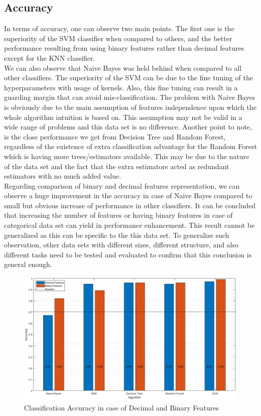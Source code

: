 \documentclass{article}
\begin{document}
\subsection{Accuracy}
In terms of accuracy, one can observe two main points. The first one is the superiority of the SVM classifier when compared to others, and the better performance resulting from using binary features rather than decimal features except for the KNN classifier. \\
\indent We can also observe that Naive Bayes was held behind when compared to all other classifiers. The superiority of the SVM can be due to the fine tuning of the hyperparameters with usage of kernels. Also, this fine tuning can result in a guarding margin that can avoid mis-classification. The problem with Naive Bayes is obviously due to the main assumption of features independence upon which the whole algorithm intuition is based on. This assumption may not be valid in a wide range of problems and this data set is no difference. Another point to note, is the close performance we get from Decision Tree and Random Forest, regardless of the existence of extra classification advantage for the Random Forest which is having more trees/estimators available. This may be due to the nature of the data set and the fact that the extra estimators acted as redundant estimators with no much added value. \\
\indent Regarding comparison of binary and decimal features representation, we can observe a huge improvement in the accuracy in case of Naive Bayes compared to small but obvious increase of performance in other classifiers. It can be concluded that increasing the number of features or having binary features in case of categorical data set can yield in performance enhancement. This result cannot be generalized as this can be specific to the this data set. To generalize such observation, other data sets with different sizes, different structure, and also different tasks need to be tested and evaluated to confirm that this conclusion is general enough.
\begin{figure}[H]
\centering
\includegraphics[width=\textwidth]{../Figures/accuracy.png}
\caption{Classification Accuracy in case of Decimal and Binary Features}
\end{figure}
\end{document}
